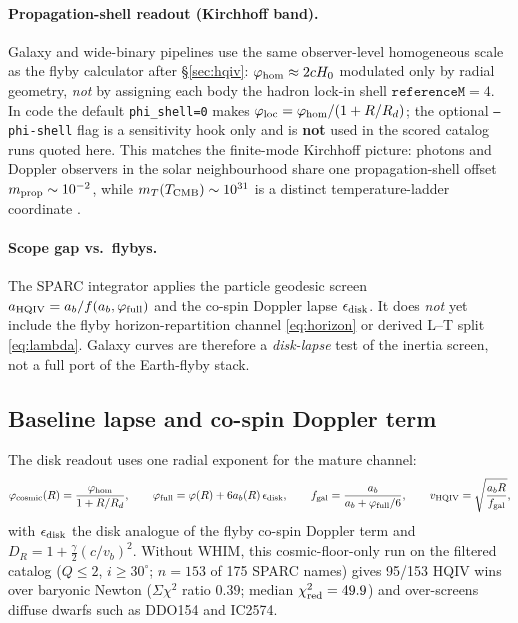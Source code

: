 \documentclass[11pt]{amsart}
\begin{document}
\paragraph{Propagation-shell readout (Kirchhoff band).}
Galaxy and wide-binary pipelines use the same observer-level homogeneous scale as the
flyby calculator after \S\ref{sec:hqiv}: $\varphi_{\rm hom}\approx 2cH_0$ modulated only
by radial geometry, \emph{not} by assigning each body the hadron lock-in shell
$\texttt{referenceM}=4$. In code the default \texttt{phi\_shell=0} makes
$\varphi_{\rm loc}=\varphi_{\rm hom}/(1+R/R_d)$; the optional \texttt{--phi-shell} flag is
a sensitivity hook only and is \textbf{not} used in the scored catalog runs quoted here.
This matches the finite-mode Kirchhoff picture: photons and Doppler observers in the
solar neighbourhood share one propagation-shell offset $m_{\rm prop}\sim10^{-2}$, while
$m_T(T_{\rm CMB})\sim10^{31}$ is a distinct temperature-ladder coordinate
\cite{hqiv-kirchhoff-paper}.

\paragraph{Scope gap vs.\ flybys.}
The SPARC integrator applies the particle geodesic screen
$a_{\rm HQIV}=a_b/f(a_b,\varphi_{\rm full})$ and the co-spin Doppler lapse
$\epsilon_{\rm disk}$. It does \emph{not} yet include the flyby horizon-repartition channel
\eqref{eq:horizon} or derived L--T split \eqref{eq:lambda}. Galaxy curves are therefore a
\emph{disk-lapse} test of the inertia screen, not a full port of the Earth-flyby stack.

\subsection{Baseline lapse and co-spin Doppler term}
The disk readout uses one radial exponent for the mature channel:
\[
\varphi_{\rm cosmic}(R)=\frac{\varphi_{\rm hom}}{1+R/R_d},
\qquad
\varphi_{\rm full}=\varphi(R)+6a_b(R)\,\epsilon_{\rm disk},
\qquad
f_{\rm gal}=\frac{a_b}{a_b+\varphi_{\rm full}/6},
\qquad
v_{\rm HQIV}=\sqrt{\frac{a_b R}{f_{\rm gal}}},
\]
with $\epsilon_{\rm disk}$ the disk analogue of the flyby co-spin Doppler term and
$D_R=1+\tfrac{\gamma}{2}(c/v_b)^2$. Without WHIM, this cosmic-floor-only run on the
filtered catalog ($Q\le 2$, $i\ge 30^\circ$; $n=153$ of 175 SPARC names) gives
95/153 HQIV wins over baryonic Newton ($\Sigma\chi^2$ ratio $0.39$; median
$\chi^2_{\rm red}=49.9$) and over-screens diffuse dwarfs such as DDO154 and IC2574.
\end{document}
